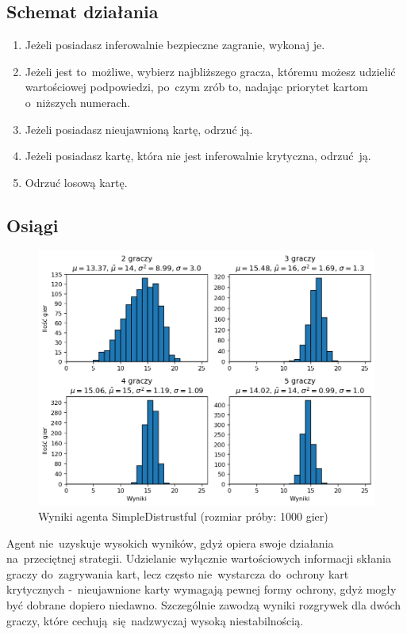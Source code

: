 \documentclass[declaration,shortabstract,inz]{iithesis}
\begin{document}
\subsection*{Schemat działania}

\begin{enumerate}
	\item Jeżeli posiadasz inferowalnie bezpieczne zagranie, wykonaj je.
	\item Jeżeli jest to~możliwe, wybierz najbliższego gracza, któremu możesz udzielić wartościowej podpowiedzi, po~czym zrób to, nadając priorytet kartom o~niższych numerach.
	\item Jeżeli posiadasz nieujawnioną kartę, odrzuć ją.
	\item Jeżeli posiadasz kartę, która nie jest inferowalnie krytyczna, odrzuć ją.
	\item Odrzuć losową kartę.
\end{enumerate}

\subsection*{Osiągi}

\begin{figure}[H]
	\centering
	\captionsetup{format=hang}
	\includegraphics[width=\textwidth,height=\textheight,keepaspectratio]{SimpleDistrustful.png}
	\caption[Caption]{Wyniki agenta SimpleDistrustful (rozmiar próby: 1000 gier)}
	\label{fig:SimpleDistrustful}
\end{figure}

Agent nie~uzyskuje wysokich wyników, gdyż opiera swoje działania na~przeciętnej strategii. Udzielanie wyłącznie wartościowych informacji skłania graczy do~zagrywania kart, lecz często nie~wystarcza do~ochrony kart krytycznych -~nieujawnione karty wymagają pewnej formy ochrony, gdyż mogły być dobrane dopiero niedawno. Szczególnie zawodzą wyniki rozgrywek dla dwóch graczy, które cechują~się nadzwyczaj wysoką niestabilnością.
\end{document}
